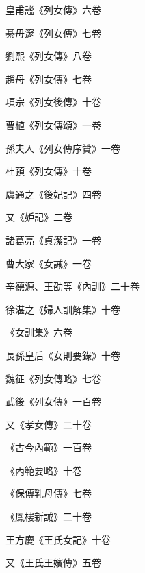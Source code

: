 \begin{pinyinscope}
 皇甫謐《列女傳》六卷



 綦毋邃《列女傳》七卷



 劉熙《列女傳》八卷



 趙母《列女傳》七卷



 項宗《列女後傳》十卷



 曹植《列女傳頌》一卷



 孫夫人《列女傳序贊》一卷



 杜預《列女傳》十卷



 虞通之《後妃記》四卷



 又《妒記》二卷



 諸葛亮《貞潔記》一卷



 曹大家《女誡》一卷



 辛德源、王劭等《內訓》二十卷



 徐湛之《婦人訓解集》十卷



 《女訓集》六卷



 長孫皇后《女則要錄》十卷



 魏征《列女傳略》七卷



 武後《列女傳》一百卷



 又《孝女傳》二十卷



 《古今內範》一百卷



 《內範要略》十卷



 《保傅乳母傳》七卷



 《鳳樓新誡》二十卷



 王方慶《王氏女記》十卷



 又《王氏王嬪傳》五卷




\end{pinyinscope}
